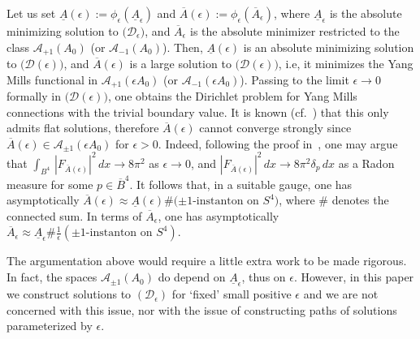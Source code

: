 \documentclass[11pt]{article}
\numberwithin{equation}{section} \setlength{\topmargin}{-35pt}
\begin{document}
Let us set
$\underline{A}(\epsilon):=\phi_{\epsilon}(\underline{A}_{\epsilon})$
and
$\overline{A}(\epsilon):=\phi_{\epsilon}(\overline{A}_{\epsilon})$,
where $\underline{A}_{\epsilon}$ is the absolute minimizing solution
to $\bigl(\mathcal{D}_\epsilon\bigr)$, and $\overline{A}_{\epsilon}$
is the absolute minimizer restricted to the class
$\mathcal{A}_{+1}(A_0)$ (or $\mathcal{A}_{-1}(A_0)$). Then,
$\underline{A}(\epsilon)$ is an absolute minimizing solution to
$\bigl(\mathcal{D}(\epsilon)\bigr)$, and $\overline{A}(\epsilon)$ is
a large solution to $\bigl(\mathcal{D}(\epsilon)\bigr)$, i.e, it
minimizes the Yang Mills functional in $\mathcal{A}_{+1}(\epsilon
A_0)$ (or $\mathcal{A}_{-1}(\epsilon A_0)$). Passing to the limit
$\epsilon\to 0$ formally in $\bigl(\mathcal{D}(\epsilon)\bigr)$, one
obtains the Dirichlet problem for Yang Mills connections with the
trivial boundary value. It is known (cf.~\cite{I}) that this only
admits flat solutions, therefore $\overline{A}(\epsilon)$ cannot
converge strongly since
$\overline{A}(\epsilon)\in\mathcal{A}_{\pm1}(\epsilon A_0)$ for
$\epsilon>0$. Indeed, following the proof in~\cite{IM}, one may
argue that $\int_{B^4}\,|F_{\overline{A}(\epsilon)}|^2\,dx\to
8\pi^2$ as $\epsilon\to 0$, and
$|F_{\overline{A}(\epsilon)}|^2\,dx\to 8\pi^2\delta_p\,dx$ as a
Radon measure for some $p\in \overline{B}^4$. It follows that, in a
suitable gauge, one has asymptotically
$\overline{A}(\epsilon)\approx\underline{A}(\epsilon)\#\text{($\pm1$-instanton
on $S^4$)}$, where $\#$ denotes the connected sum. In terms of
$\overline{A}_{\epsilon}$, one has asymptotically
$\overline{A}_{\epsilon}\approx\underline{A}_{\epsilon}\#\frac{1}{\epsilon}(\text{$\pm1$-instanton
on $S^4$})$.
\begin{remark}
\label{R2.2} The argumentation above would require a little extra
work to be made rigorous. In fact, the spaces
$\mathcal{A}_{\pm1}(A_0)$ do depend on $\underline A_\epsilon$, thus
on $\epsilon$. However, in this paper we construct solutions to
$(\mathcal{D}_\epsilon)$ for `fixed' small positive $\epsilon$ and
we are not concerned with this issue, nor with the issue of
constructing paths of solutions parameterized by $\epsilon$.
\end{remark}
\end{document}
